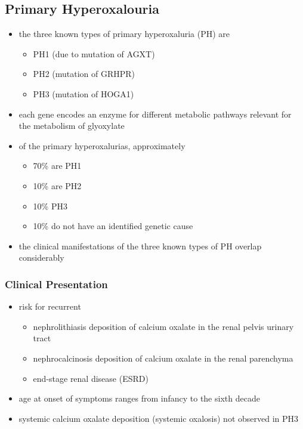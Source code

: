 \documentclass[12pt]{scrartcl}
\begin{document}
\subsection{Primary Hyperoxalouria}
\label{sec:org1df2d01}
\begin{itemize}
\item the three known types of primary hyperoxaluria (PH) are
\begin{itemize}
\item PH1 (due to mutation of AGXT)
\item PH2 (mutation of GRHPR)
\item PH3 (mutation of HOGA1)
\end{itemize}
\item each gene encodes an enzyme for different metabolic pathways
relevant for the metabolism of glyoxylate
\item of the primary hyperoxalurias, approximately
\begin{itemize}
\item 70\% are PH1
\item 10\% are PH2
\item 10\% PH3
\item 10\% do not have an identified genetic cause
\end{itemize}
\item the clinical manifestations of the three known types of
PH overlap considerably
\end{itemize}
\subsubsection{Clinical Presentation}
\label{sec:org09176a8}
\begin{itemize}
\item risk for recurrent
\begin{itemize}
\item nephrolithiasis  deposition of calcium oxalate in the renal pelvis  urinary tract
\item nephrocalcinosis  deposition of calcium oxalate in the renal parenchyma
\item end-stage renal disease (ESRD)
\end{itemize}
\item age at onset of symptoms ranges from infancy to the sixth decade
\item systemic calcium oxalate deposition (systemic oxalosis) not observed in PH3
\end{itemize}
\end{document}
